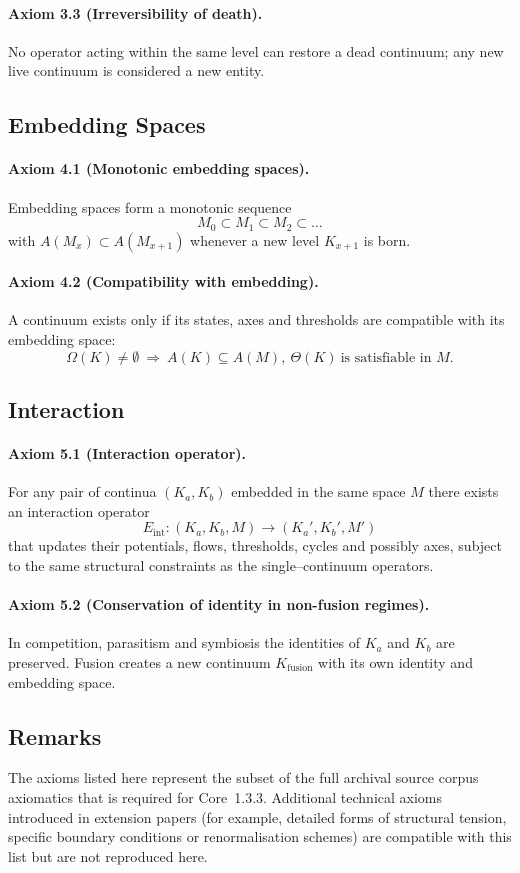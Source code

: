 \paragraph{Axiom 3.3 (Irreversibility of death).}
No operator acting within the same level can restore a dead continuum; any new
live continuum is considered a new entity.

\subsection{Embedding Spaces}

\paragraph{Axiom 4.1 (Monotonic embedding spaces).}
Embedding spaces form a monotonic sequence
\[
  M_0 \subset M_1 \subset M_2 \subset \dots
\]
with
\(A(M_x)\subset A(M_{x+1})\) whenever a new level \(K_{x+1}\) is born.

\paragraph{Axiom 4.2 (Compatibility with embedding).}
A continuum exists only if its states, axes and thresholds are compatible with
its embedding space:
\[
  \Omega(K)\neq\emptyset
  \ \Longrightarrow\
  A(K)\subseteq A(M),\
  \Theta(K) \ \text{is satisfiable in } M.
\]

\subsection{Interaction}

\paragraph{Axiom 5.1 (Interaction operator).}
For any pair of continua \((K_a,K_b)\) embedded in the same space \(M\) there
exists an interaction operator
\[
  E_{\mathrm{int}} : (K_a,K_b,M) \to (K_a',K_b',M')
\]
that updates their potentials, flows, thresholds, cycles and possibly axes,
subject to the same structural constraints as the single--continuum operators.

\paragraph{Axiom 5.2 (Conservation of identity in non-fusion regimes).}
In competition, parasitism and symbiosis the identities of \(K_a\) and \(K_b\)
are preserved.  Fusion creates a new continuum \(K_{\mathrm{fusion}}\) with its
own identity and embedding space.

\subsection{Remarks}

The axioms listed here represent the subset of the full archival source corpus axiomatics
that is required for Core~1.3.3. Additional technical axioms introduced in
extension papers (for example, detailed forms of structural tension, specific
boundary conditions or renormalisation schemes) are compatible with this list
but are not reproduced here.
